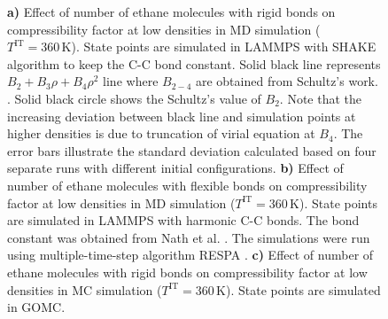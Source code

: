 \documentclass[5p,times]{elsarticle}
\begin{document}
\begin{figure}
\caption{
\textbf{a)} Effect of number of ethane molecules with rigid bonds on compressibility factor at low densities in MD simulation ($T^{\mathrm{IT}}=360 \, \mathrm{K}$). State points are simulated in LAMMPS with SHAKE algorithm to keep the C-C bond constant. Solid black line represents $B_2+B_3 \rho+B_4 \rho^2$ line where $B_{2-4}$ are obtained from Schultz's work. \cite{Schultz2010a}. Solid black circle shows the Schultz's value of $B_2$. Note that the increasing  deviation between black line and simulation points at higher densities is due to truncation of virial equation at $B_4$. The error bars illustrate the standard deviation calculated based on four separate runs with different initial configurations.
\textbf{b)} Effect of number of ethane molecules with flexible bonds on compressibility factor at low densities in MD simulation ($T^{\mathrm{IT}}=360 \, \mathrm{K}$). State points are simulated in LAMMPS with harmonic C-C bonds. The bond constant was obtained from Nath et al.  \cite{Nath1998a}. The simulations were run using multiple-time-step algorithm RESPA \cite{tuckerman1992}.
\textbf{c)} Effect of number of ethane molecules with rigid bonds on compressibility factor at low densities in MC simulation ($T^{\mathrm{IT}}=360 \, \mathrm{K}$). State points are simulated in GOMC.
}
\label{fig:FSE_TraPPE_C2_abc}
\end{figure}
\end{document}

